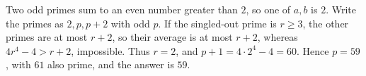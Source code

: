 Two odd primes sum to an even number greater than $2$, so one of $a,b$ is $2$. Write the primes as $2,p,p+2$ with odd $p$. If the singled-out prime is $r\ge3$, the other primes are at most $r+2$, so their average is at most $r+2$, whereas $4r^4-4>r+2$, impossible. Thus $r=2$, and $p+1=4\cdot2^4-4=60$. Hence $p=59$, with $61$ also prime, and the answer is $\boxed{59}$.
